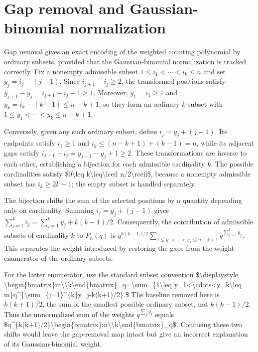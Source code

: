 \documentclass[11pt]{article}
\begin{document}
\section{Gap removal and Gaussian-binomial normalization}
Gap removal gives an exact encoding of the weighted counting polynomial by ordinary subsets, provided that the Gaussian-binomial normalization is tracked correctly. Fix a nonempty admissible subset $1\leq i_1<\cdots<i_k\leq n$ and set $y_j=i_j-(j-1)$. Since $i_{j+1}-i_j\geq2$, the transformed positions satisfy $y_{j+1}-y_j=i_{j+1}-i_j-1\geq1$. Moreover, $y_1=i_1\geq1$ and $y_k=i_k-(k-1)\leq n-k+1$, so they form an ordinary $k$-subset with $1\leq y_1<\cdots<y_k\leq n-k+1$.

Conversely, given any such ordinary subset, define $i_j=y_j+(j-1)$. Its endpoints satisfy $i_1\geq1$ and $i_k\leq(n-k+1)+(k-1)=n$, while its adjacent gaps satisfy $i_{j+1}-i_j=y_{j+1}-y_j+1\geq2$. These transformations are inverse to each other, establishing a bijection for each admissible cardinality $k$. The possible cardinalities satisfy \$0\textbackslash{}leq k\textbackslash{}leq\textbackslash{}lceil n/2\textbackslash{}rceil\$, because a nonempty admissible subset has $i_k\geq2k-1$; the empty subset is handled separately.

The bijection shifts the sum of the selected positions by a quantity depending only on cardinality. Summing $i_j=y_j+(j-1)$ gives $\sum_{j=1}^{k}i_j=\sum_{j=1}^{k}y_j+k(k-1)/2$. Consequently, the contribution of admissible subsets of cardinality $k$ to $P_n(q)$ is
$\displaystyle q^{k(k-1)/2}\sum_{1\leq y_1<\cdots<y_k\leq n-k+1}q^{\sum_{j=1}^{k}y_j}.$
This separates the weight introduced by restoring the gaps from the weight enumerator of the ordinary subsets.

For the latter enumerator, use the standard subset convention
\$\textbackslash{}displaystyle \textbackslash{}begin\{bmatrix\}m\textbackslash{}\textbackslash{}k\textbackslash{}end\{bmatrix\}\_q=\textbackslash{}sum\_\{1\textbackslash{}leq y\_1\textless{}\textbackslash{}cdots\textless{}y\_k\textbackslash{}leq m\}q\textasciicircum{}\{\textbackslash{}sum\_\{j=1\}\textasciicircum{}\{k\}y\_j-k(k+1)/2\}.\$
The baseline removed here is $k(k+1)/2$, the sum of the smallest possible ordinary subset, not $k(k-1)/2$. Thus the unnormalized sum of the weights $q^{\sum_j y_j}$ equals \$q\textasciicircum{}\{k(k+1)/2\}\textbackslash{}begin\{bmatrix\}m\textbackslash{}\textbackslash{}k\textbackslash{}end\{bmatrix\}\_q\$. Confusing these two shifts would leave the gap-removal map intact but give an incorrect explanation of its Gaussian-binomial weight.
\end{document}
